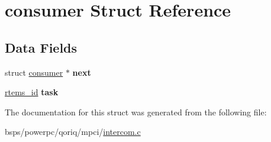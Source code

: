 \hypertarget{structconsumer}{}\section{consumer Struct Reference}
\label{structconsumer}
\subsection*{Data Fields}
\begin{DoxyCompactItemize}
\item 
\mbox{\label{structconsumer_a88fe8afaf5817900793fe22bd577cfec}} 
struct \mbox{\hyperlink{structconsumer}{consumer}} $\ast$ {\bfseries next}
\item 
\mbox{\label{structconsumer_ad9fa2bd04b54e30df033b48432c9646e}} 
\mbox{\hyperlink{group__ClassicTasks_gab20892b814dced7dd4e5b9bf42becd57}{rtems\+\_\+id}} {\bfseries task}
\end{DoxyCompactItemize}


The documentation for this struct was generated from the following file\+:\begin{DoxyCompactItemize}
\item 
bsps/powerpc/qoriq/mpci/\mbox{\hyperlink{intercom_8c}{intercom.\+c}}\end{DoxyCompactItemize}
